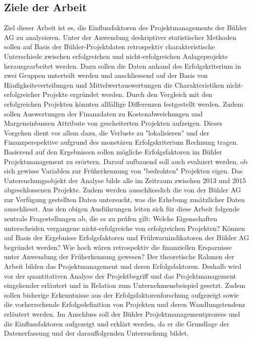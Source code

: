 \subsection{Ziele der Arbeit}\label{sec:zda}
Ziel dieser Arbeit ist es, die Einflussfaktoren des Projektmanagements der Bühler AG zu analysieren. Unter der Anwendung deskriptiver statistischer Methoden sollen auf Basis der Bühler-Projektdaten retrospektiv charakteristische Unterschiede zwischen erfolgreichen und nicht-erfolgreichen Anlageprojekte herausgearbeitet werden. Dazu sollen die Daten anhand des Erfolgskriterium in zwei Gruppen unterteilt werden und anschliessend auf der Basis von Häufigkeitsverteilungen und Mittelwertauswertungen die Charakteristiken nicht-erfolgreicher Projekte ergründet werden. Durch den Vergleich mit den erfolgreichen Projekten könnten allfällige Differenzen festgestellt werden. Zudem sollen Auswertungen der Finanzdaten zu Kostenabweichungen und Margeneinbussen Attribute von gescheiterten Projekten aufzeigen. Dieses Vorgehen dient vor allem dazu, die Verluste zu "lokalisieren" und der Finanzperspektive aufgrund des monetären Erfolgskriterium Rechnung tragen. Basierend auf den Ergebnissen sollen mögliche Erfolgsfaktoren im Bühler Projektmanagement zu erörtern. Darauf aufbauend soll auch evaluiert werden, ob sich gewisse Variablen zur Früherkennung von "bedrohten" Projekten eigen. Das Untersuchungsobjekt der Analyse bilde alle im Zeitraum zwischen 2013 und 2015 abgeschlossenen Projekte. Zudem werden ausschliesslich die von der Bühler AG zur Verfügung gestellten Daten untersucht, was die Erhebung zusätzlicher Daten ausschliesst. Aus den obigen Ausführungen leiten sich für diese Arbeit folgende zentrale Fragestellungen ab, die es zu prüfen gilt:
\newline\newline
Welche Eigenschaften unterscheiden vergangene nicht-erfolgreiche von erfolgreichen Projekten? Können auf Basis der Ergebnisse Erfolgsfaktoren und Frühwarnindikatoren der Bühler AG begründet werden? Wie hoch wären retrospektiv die finanziellen Ersparnisse unter Anwendung der Früherkennung gewesen?
\newline\newline
Der theoretische Rahmen der Arbeit bilden das Projektmanagement und deren Erfolgsfaktoren. Deshalb wird vor 
der quantitativen Analyse der Projektbegriff und das Projektmanagement eingehender erläutert und in Relation zum Unternehmensbeispiel gesetzt. Zudem sollen bisherige Erkenntnisse aus der Erfolgsfaktorenforschung aufgezeigt sowie die vorherrschende Erfolgsdefinition von Projekten und deren Wandlungstendenz erläutert werden. Im Anschluss soll der Bühler Projektmanagementprozess und die Einflussfaktoren aufgezeigt und erklärt werden, da er die Grundlage der Datenerfassung und der darauffolgenden Untersuchung bildet. 
